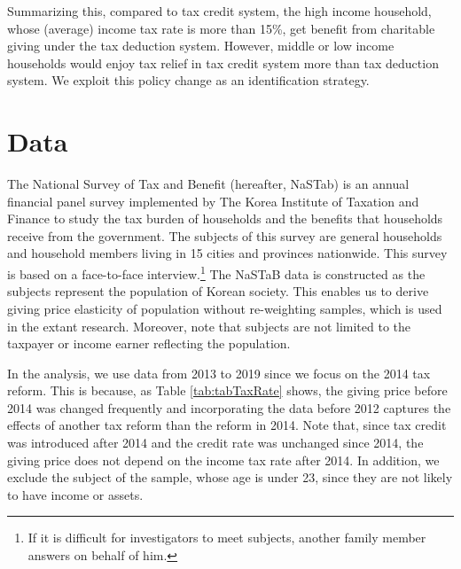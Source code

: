 \documentclass[
  11pt,
  a4paper,
]{article}
\begin{document}
Summarizing this, compared to tax credit system, the high income household, whose (average) income tax rate is more than 15\%, get benefit from charitable giving under the tax deduction system. However, middle or low income households would enjoy tax relief in tax credit system more than tax deduction system. We exploit this policy change as an identification strategy.

\hypertarget{data}{%
\section{Data}\label{data}}

The National Survey of Tax and Benefit (hereafter, NaSTab) is an annual financial panel survey
implemented by The Korea Institute of Taxation and Finance
to study the tax burden of households and the benefits that households receive from the government.
The subjects of this survey are general households and household members living in 15 cities and provinces nationwide.
This survey is based on a face-to-face interview.\footnote{If it is difficult for investigators to meet subjects, another family member answers on behalf of him.}
The NaSTaB data is constructed as the subjects represent the population of Korean society.
This enables us to derive giving price elasticity of population without re-weighting samples, which is used in the extant research.
Moreover, note that subjects are not limited to the taxpayer or income earner reflecting the population.

In the analysis, we use data from 2013 to 2019 since we focus on the 2014 tax reform. This is because, as Table \ref{tab:tabTaxRate} shows, the giving price before 2014 was changed frequently and incorporating the data before 2012 captures the effects of another tax reform than the reform in 2014. Note that, since tax credit was introduced after 2014 and the credit rate was unchanged since 2014, the giving price does not depend on the income tax rate after 2014.
In addition, we exclude the subject of the sample, whose age is under 23, since they are not likely to have income or assets.
\end{document}
